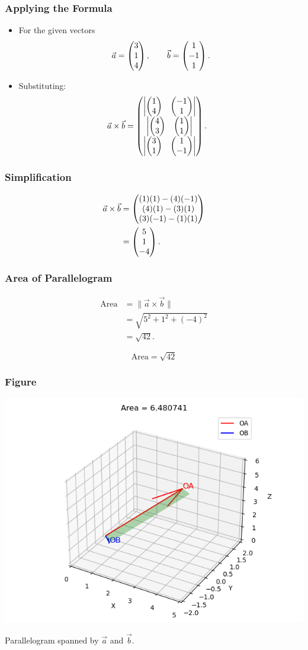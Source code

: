\documentclass{beamer}
\begin{document}
\begin{frame}
\frametitle{Applying the Formula}
\begin{itemize}
\item For the given vectors
\begin{align}
\Vec{a} = \begin{pmatrix}3 \\ 1 \\ 4\end{pmatrix}, \qquad
\Vec{b} = \begin{pmatrix}1 \\ -1 \\ 1\end{pmatrix}.
\end{align}

\item Substituting:
\begin{align}
\Vec{a}\times\Vec{b} &=
\begin{pmatrix}
\begin{vmatrix}\begin{pmatrix}1 \\ 4\end{pmatrix} & \begin{pmatrix}-1 \\ 1\end{pmatrix}\end{vmatrix} \\
\begin{vmatrix}\begin{pmatrix}4 \\ 3\end{pmatrix} & \begin{pmatrix}1 \\ 1\end{pmatrix}\end{vmatrix} \\
\begin{vmatrix}\begin{pmatrix}3 \\ 1\end{pmatrix} & \begin{pmatrix}1 \\ -1\end{pmatrix}\end{vmatrix}
\end{pmatrix}.
\end{align}
\end{itemize}
\end{frame}

\begin{frame}
\frametitle{Simplification}
\begin{align}
\Vec{a}\times\Vec{b} &=
\begin{pmatrix}
(1)(1) - (4)(-1) \\
(4)(1) - (3)(1) \\
(3)(-1) - (1)(1)
\end{pmatrix} \\
&= \begin{pmatrix}5 \\ 1 \\ -4\end{pmatrix}.
\end{align}
\end{frame}

\begin{frame}
\frametitle{Area of Parallelogram}
\begin{align}
\text{Area} &= \|\Vec{a}\times\Vec{b}\| \\
&= \sqrt{5^2 + 1^2 + (-4)^2} \\
&= \sqrt{42}.
\end{align}

\[
\boxed{\text{Area} = \sqrt{42}}
\]
\end{frame}

\begin{frame}
\frametitle{Figure}
\centering
\includegraphics[width=0.6\linewidth]{figs/fig.png}
\caption{Parallelogram spanned by $\Vec{a}$ and $\Vec{b}$.}
\end{frame}
\end{document}
